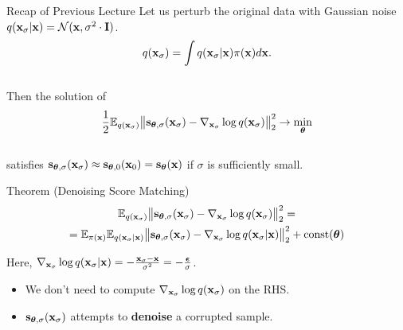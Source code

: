 \documentclass{beamer}
\begin{document}
\begin{frame}
\titlepage
\end{frame}
\begin{frame}{Recap of Previous Lecture}
    Let us perturb the original data with Gaussian noise $q(\mathbf{x}_{\sigma} | \mathbf{x}) = \mathcal{N}(\mathbf{x}, \sigma^2 \cdot \mathbf{I})$.
    \vspace{-0.3cm}
    \[
        q(\mathbf{x}_{\sigma}) = \int q(\mathbf{x}_{\sigma} | \mathbf{x}) \pi(\mathbf{x}) d\mathbf{x}.
    \]
    \vspace{-0.6cm} \\
    Then the solution of 
    \vspace{-0.2cm}
    \[
        \frac{1}{2} \mathbb{E}_{q(\mathbf{x}_{\sigma})}\bigl\| \mathbf{s}_{\boldsymbol{\theta}, \sigma}(\mathbf{x}_{\sigma}) - \nabla_{\mathbf{x}_{\sigma}} \log q(\mathbf{x}_{\sigma}) \bigr\|^2_2 \rightarrow \min_{\boldsymbol{\theta}}
    \]
    \vspace{-0.5cm} \\
    satisfies $\mathbf{s}_{\boldsymbol{\theta}, \sigma}(\mathbf{x}_{\sigma}) \approx \mathbf{s}_{\boldsymbol{\theta}, 0}(\mathbf{x}_0) = \mathbf{s}_{\boldsymbol{\theta}}(\mathbf{x})$ if $\sigma$ is sufficiently small.
    \begin{block}{Theorem (Denoising Score Matching)}
        \vspace{-0.8cm}
        \begin{multline*}
            \mathbb{E}_{q(\mathbf{x}_{\sigma})}\bigl\| \mathbf{s}_{\boldsymbol{\theta}, \sigma}(\mathbf{x}_{\sigma}) - \nabla_{\mathbf{x}_{\sigma}} \log q(\mathbf{x}_{\sigma}) \bigr\|^2_2 = \\ = \mathbb{E}_{\pi(\mathbf{x})} \mathbb{E}_{q(\mathbf{x}_{\sigma} | \mathbf{x})}\bigl\| \mathbf{s}_{\boldsymbol{\theta}, \sigma}(\mathbf{x}_{\sigma}) - \nabla_{\mathbf{x}_{\sigma}} \log q(\mathbf{x}_{\sigma} | \mathbf{x}) \bigr\|^2_2 + \text{const}(\boldsymbol{\theta})
        \end{multline*}
        \vspace{-0.7cm}
    \end{block}
    Here, $\nabla_{\mathbf{x}_{\sigma}} \log q(\mathbf{x}_{\sigma} | \mathbf{x}) = - \frac{\mathbf{x}_{\sigma} - \mathbf{x}}{\sigma^2} = - \frac{\boldsymbol{\epsilon}}{\sigma}$.
    \begin{itemize}
        \item We don't need to compute $\nabla_{\mathbf{x}_{\sigma}} \log q(\mathbf{x}_{\sigma})$ on the RHS.
        \item $\mathbf{s}_{\boldsymbol{\theta}, \sigma}(\mathbf{x}_{\sigma})$ attempts to \textbf{denoise} a corrupted sample.
    \end{itemize}
\end{frame}
\end{document}
